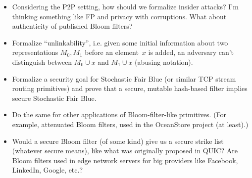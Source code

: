 \begin{itemize}
\item Considering the P2P setting, how should we formalize insider attacks?  I'm thinking something like FP and privacy with corruptions.  What about authenticity of published Bloom filters?

\item Formalize ``unlinkability'', i.e. given some initial information about two representations $M_0,M_1$ before an element~$x$ is added, an adversary can't distinguish between $M_0 \cup x$ and $M_1 \cup x$ (abusing notation).  

\item Formalize a security goal for Stochastic Fair Blue (or similar TCP stream routing primitives) and prove that a secure, mutable hash-based filter implies secure Stochastic Fair Blue.

\item Do the same for other applications of Bloom-filter-like primitives.  (For example, attenuated Bloom filters, used in the OceanStore project (at least).)

\item Would a secure Bloom filter (of some kind) give us a secure strike list (whatever secure means), like what was originally proposed in QUIC?  Are Bloom filters used in edge network servers for big providers like Facebook, LinkedIn, Google, etc.?
\end{itemize}

